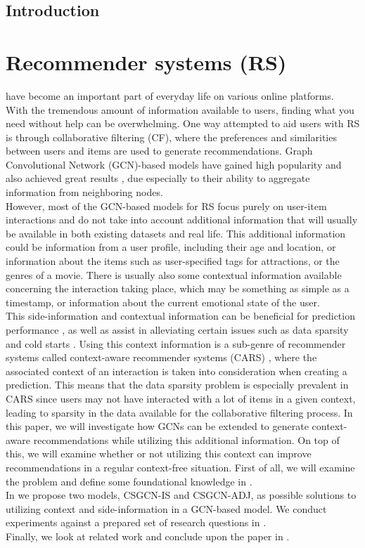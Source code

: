 \noindent
\section{Introduction}
\chapter{Recommender systems (RS)}\label{ch:introduction}
have become an important part of everyday life on various online platforms.
\\
With the tremendous amount of information available to users, finding what you need without help can be overwhelming.
One way attempted to aid users with RS is through collaborative filtering (CF), where the preferences and similarities between users and items are used to generate recommendations. 
Graph Convolutional Network (GCN)-based models have gained high popularity and also achieved great results \cite{NGCF,LightGCN,KGAT}, due especially to their ability to aggregate information from neighboring nodes.\\
However, most of the GCN-based models for RS focus purely on user-item interactions and do not take into account additional information that will usually be available in both existing datasets and real life.
This additional information could be information from a user profile, including their age and location, or information about the items such as user-specified tags for attractions, or the genres of a movie.
There is usually also some contextual information available concerning the interaction taking place, which may be something as simple as a timestamp, or information about the current emotional state of the user.\\
This side-information and contextual information can be beneficial for prediction performance \cite{ContextImportance2}, as well as assist in alleviating certain issues such as data sparsity and cold starts \cite{SideInfoDefinition}.
Using this context information is a sub-genre of recommender systems called context-aware recommender systems (CARS) \cite{carsprogress}, where the associated context of an interaction is taken into consideration when creating a prediction.
This means that the data sparsity problem is especially prevalent in CARS since users may not have interacted with a lot of items in a given context, leading to sparsity in the data available for the collaborative filtering process.
In this paper, we will investigate how GCNs can be extended to generate context-aware recommendations while utilizing this additional information.
On top of this, we will examine whether or not utilizing this context can improve recommendations in a regular context-free situation.
First of all, we will examine the problem and define some foundational knowledge in .\\
In  we propose two models, CSGCN-IS and CSGCN-ADJ, as possible solutions to utilizing context and side-information in a GCN-based model.
We conduct experiments against a prepared set of research questions in .\\
Finally, we look at related work and conclude upon the paper in .
\\\\
